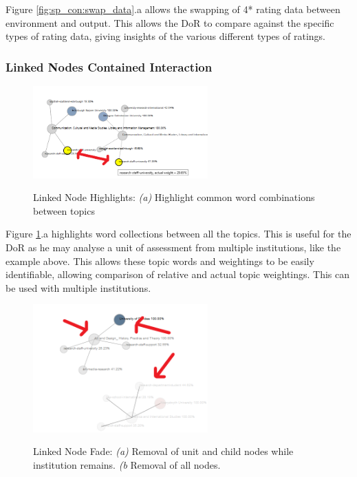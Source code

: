 \documentclass[a4paper, 11pt]{article}
\begin{document}
\noindent Figure \ref{fig:sp_con:swap_data}.a allows the swapping of 4* rating data between environment and output. This allows the DoR to compare against the specific types of rating data, giving insights of the various different types of ratings.


\subsubsection{Linked Nodes Contained Interaction}
\begin{figure}[hbt!]
	\centering
      \includegraphics[width=0.6\textwidth]{imgs/ln_int/topic_weight_highlight.png} \\
	\caption{Linked Node Highlights: 
	\textit{(a)} Highlight common word combinations between topics}
    \label{fig:lp_con:common_topic_words}
     \noindent\makebox[\linewidth]{\rule{\textwidth}{0.4pt}}
\end{figure}

\noindent Figure \ref{fig:lp_con:common_topic_words}.a highlights word collections between all the topics. This is useful for the DoR as he may analyse a unit of assessment from multiple institutions, like the example above. This allows these topic words and weightings to be easily identifiable, allowing comparison of relative and actual topic weightings. This can be used with multiple institutions. \\


\begin{figure}[hbt!]
	\centering
      \includegraphics[width=0.6\textwidth]{imgs/ln_int/remove_nodes.png} \\
	\caption{Linked Node Fade: 
	\textit{(a)} Removal of unit and child nodes while institution remains.
	\textit{(b} Removal of all nodes.}
    \label{fig:lp_con:remove_nodes}
     \noindent\makebox[\linewidth]{\rule{\textwidth}{0.4pt}}
\end{figure}
\end{document}
